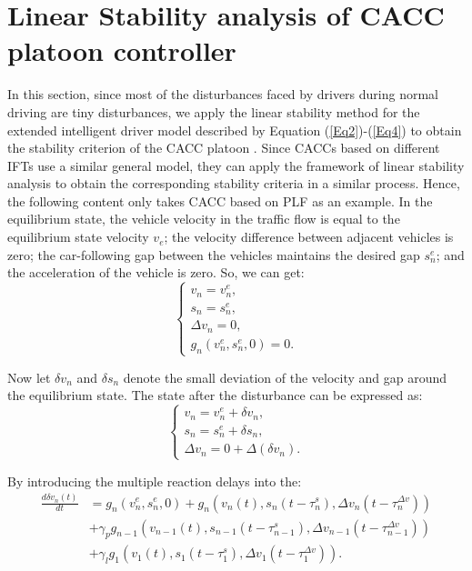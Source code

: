 \documentclass[journal]{IEEEtran}
\begin{document}
\section{Linear Stability analysis of CACC platoon controller}
\label{Section 4}
In this section, since most of the disturbances faced by drivers during normal driving are tiny disturbances, we apply the linear stability method for the extended intelligent driver model described by Equation (\ref{Eq2})-(\ref{Eq4}) to obtain the stability criterion of the CACC platoon \citep{jin2014dynamics,sun2018stability}. Since CACCs based on different IFTs use a similar general model, they can apply the framework of linear stability analysis to obtain the corresponding stability criteria in a similar process. Hence, the following content only takes CACC based on PLF as an example.
In the equilibrium state, the vehicle velocity in the traffic flow is equal to the equilibrium state velocity $v_e$; the velocity difference between adjacent vehicles is zero; the car-following gap between the vehicles maintains the desired gap $s_n^e$; and the acceleration of the vehicle is zero. So, we can get:
\begin{equation}
  \left\{\begin{array}{l}
    v_{n}=v_{n}^{e}, \\
    s_{n}=s_{n}^{e}, \\
    \Delta v_{n}=0,  \\
    g_{n}\left(v_{n}^{e}, s_{n}^{e}, 0\right)=0.
  \end{array}\right.
  \label{Eq5}
\end{equation}

Now let $\delta v_n$ and $\delta s_n$ denote the small deviation of the velocity and gap around the equilibrium state. The state after the disturbance can be expressed as:
\begin{equation}
  \left\{\begin{array}{l}
    v_{n}=v_{n}^{e}+\delta v_{n}, \\
    s_{n}=s_{n}^{e}+\delta s_{n}, \\
    \Delta v_{n}=0+\Delta\left(\delta v_{n}\right).
  \end{array}\right.
  \label{Eq6}
\end{equation}

By introducing the multiple reaction delays into the:
\begin{equation}
  \begin{aligned}
    \frac{d \delta v_{n}(t)}{d t} & =g_{n}\left(v_{n}^{e}, s_{n}^{e}, 0\right)+g_{n}\left(v_{n}(t), s_{n}\left(t-\tau_{n}^{s}\right), \Delta v_{n}\left(t-\tau_{n}^{\Delta v}\right)\right) \\
                                  & +\gamma_{p} g_{n-1}\left(v_{n-1}(t), s_{n-1}\left(t-\tau_{n-1}^{s}\right), \Delta v_{n-1}\left(t-\tau_{n-1}^{\Delta v}\right)\right)                    \\
                                  & +\gamma_{l} g_{1}\left(v_{1}(t), s_{1}\left(t-\tau_{1}^{s}\right), \Delta v_{1}\left(t-\tau_{1}^{\Delta v}\right)\right).
  \end{aligned}
  \label{Eq7}
\end{equation}
\end{document}
